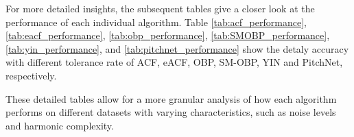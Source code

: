 \documentclass{ieeeaccess}
\begin{document}
For more detailed insights, the subsequent tables give a closer look at the performance of each individual algorithm. Table \ref{tab:acf_performance}, \ref{tab:eacf_performance}, \ref{tab:obp_performance}, \ref{tab:SMOBP_performance}, \ref{tab:yin_performance}, and \ref{tab:pitchnet_performance} show the detaly accuracy with different tolerance rate of ACF, eACF, OBP, SM-OBP, YIN and PitchNet, respectively.


These detailed tables allow for a more granular analysis of how each algorithm performs on different datasets with varying characteristics, such as noise levels and harmonic complexity.


\begin{table}[h!]
\centering
{}
\caption{Performance comparison across algorithms and datasets}
\label{tab:performance_comparison}
\end{table}
\end{document}
